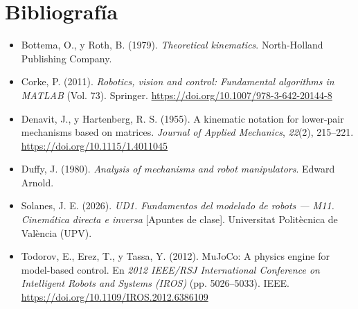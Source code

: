 \documentclass[11pt,a4paper]{article}
\begin{document}
\section{Bibliografía}

\begin{itemize}
    \setlength{\itemsep}{6pt}
    \item[] Bottema, O., y Roth, B. (1979). \textit{Theoretical kinematics}. North-Holland Publishing Company.
    \item[] Corke, P. (2011). \textit{Robotics, vision and control: Fundamental algorithms in MATLAB} (Vol. 73). Springer. \url{https://doi.org/10.1007/978-3-642-20144-8}
    \item[] Denavit, J., y Hartenberg, R. S. (1955). A kinematic notation for lower-pair mechanisms based on matrices. \textit{Journal of Applied Mechanics}, \textit{22}(2), 215--221. \url{https://doi.org/10.1115/1.4011045}
    \item[] Duffy, J. (1980). \textit{Analysis of mechanisms and robot manipulators}. Edward Arnold.
    \item[] Solanes, J. E. (2026). \textit{UD1. Fundamentos del modelado de robots — M11. Cinemática directa e inversa} [Apuntes de clase]. Universitat Politècnica de València (UPV).
    \item[] Todorov, E., Erez, T., y Tassa, Y. (2012). MuJoCo: A physics engine for model-based control. En \textit{2012 IEEE/RSJ International Conference on Intelligent Robots and Systems (IROS)} (pp. 5026--5033). IEEE. \url{https://doi.org/10.1109/IROS.2012.6386109}
\end{itemize}
\end{document}

